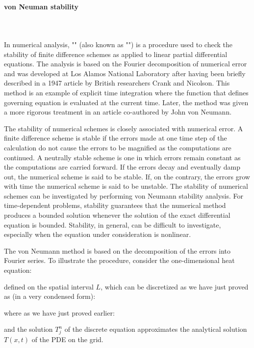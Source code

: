 	\paragraph{von Neuman stability}\mbox{}\\\\
	In numerical analysis, "" (also known as "") is a procedure used to check the stability of finite difference schemes as applied to linear partial differential equations. The analysis is based on the Fourier decomposition of numerical error and was developed at Los Alamos National Laboratory after having been briefly described in a 1947 article by British researchers Crank and Nicolson. This method is an example of explicit time integration where the function that defines governing equation is evaluated at the current time. Later, the method was given a more rigorous treatment in an article co-authored by John von Neumann.
	
	The stability of numerical schemes is closely associated with numerical error. A finite difference scheme is stable if the errors made at one time step of the calculation do not cause the errors to be magnified as the computations are continued. A neutrally stable scheme is one in which errors remain constant as the computations are carried forward. If the errors decay and eventually damp out, the numerical scheme is said to be stable. If, on the contrary, the errors grow with time the numerical scheme is said to be unstable. The stability of numerical schemes can be investigated by performing von Neumann stability analysis. For time-dependent problems, stability guarantees that the numerical method produces a bounded solution whenever the solution of the exact differential equation is bounded. Stability, in general, can be difficult to investigate, especially when the equation under consideration is nonlinear.
	 
	The von Neumann method is based on the decomposition of the errors into Fourier series. To illustrate the procedure, consider the one-dimensional heat equation:
	
	defined on the spatial interval $L$, which can be discretized as we have just proved as (in a very condensed form):
	
	where as we have just proved earlier:
	
	and the solution $T_j^n$ of the discrete equation approximates the analytical solution $T(x,t)$ of the PDE on the grid.
	
